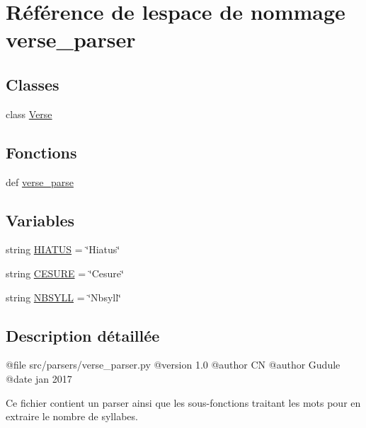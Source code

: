 \hypertarget{namespaceverse__parser}{}\section{Référence de l\textquotesingle{}espace de nommage verse\+\_\+parser}
\label{namespaceverse__parser}
\subsection*{Classes}
\begin{DoxyCompactItemize}
\item 
class \hyperlink{classverse__parser_1_1_verse}{Verse}
\end{DoxyCompactItemize}
\subsection*{Fonctions}
\begin{DoxyCompactItemize}
\item 
def \hyperlink{namespaceverse__parser_aeb9f06acdd9aa71f689c9b0412545e09}{verse\+\_\+parse}
\end{DoxyCompactItemize}
\subsection*{Variables}
\begin{DoxyCompactItemize}
\item 
string \hyperlink{namespaceverse__parser_ad0031ce21a9b7173cf4e6326dc01333e}{H\+I\+A\+T\+U\+S} = \char`\"{}Hiatus\char`\"{}
\item 
string \hyperlink{namespaceverse__parser_a06797ef2f1afa3cf15dd9ffcca23562e}{C\+E\+S\+U\+R\+E} = \char`\"{}Cesure\char`\"{}
\item 
string \hyperlink{namespaceverse__parser_adacd70f9f57e19f6f317ef8ce8146edc}{N\+B\+S\+Y\+L\+L} = \char`\"{}Nbsyll\char`\"{}
\end{DoxyCompactItemize}


\subsection{Description détaillée}
\begin{DoxyVerb}@file src/parsers/verse_parser.py
@version 1.0
@author CN
@author Gudule
@date jan 2017

Ce fichier contient un parser ainsi que les sous-fonctions traitant les mots
pour en extraire le nombre de syllabes.\end{DoxyVerb}
 


